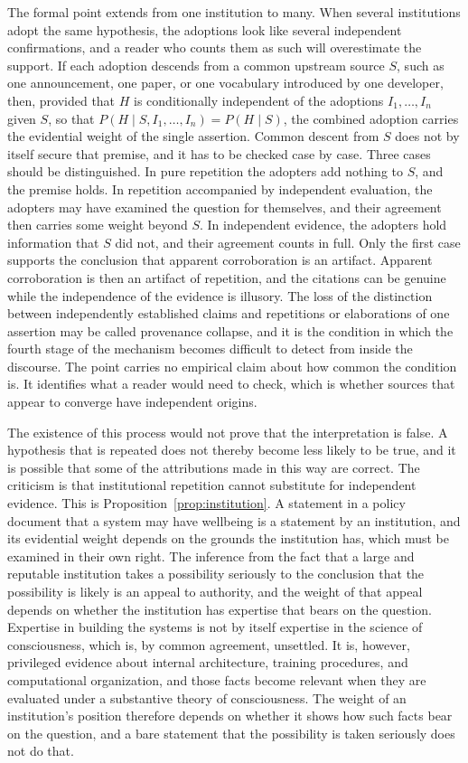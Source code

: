 \documentclass[12pt]{article}
\theoremstyle{definition}
\begin{document}
The formal point extends from one institution to many. When several institutions adopt the same hypothesis, the adoptions look like several independent confirmations, and a reader who counts them as such will overestimate the support. If each adoption descends from a common upstream source $S$, such as one announcement, one paper, or one vocabulary introduced by one developer, then, provided that $H$ is conditionally independent of the adoptions $I_1,\dots,I_n$ given $S$, so that $P(H\mid S, I_1,\dots,I_n)=P(H\mid S)$, the combined adoption carries the evidential weight of the single assertion. Common descent from $S$ does not by itself secure that premise, and it has to be checked case by case. Three cases should be distinguished. In pure repetition the adopters add nothing to $S$, and the premise holds. In repetition accompanied by independent evaluation, the adopters may have examined the question for themselves, and their agreement then carries some weight beyond $S$. In independent evidence, the adopters hold information that $S$ did not, and their agreement counts in full. Only the first case supports the conclusion that apparent corroboration is an artifact. Apparent corroboration is then an artifact of repetition, and the citations can be genuine while the independence of the evidence is illusory. The loss of the distinction between independently established claims and repetitions or elaborations of one assertion may be called provenance collapse, and it is the condition in which the fourth stage of the mechanism becomes difficult to detect from inside the discourse. The point carries no empirical claim about how common the condition is. It identifies what a reader would need to check, which is whether sources that appear to converge have independent origins.

The existence of this process would not prove that the interpretation is false. A hypothesis that is repeated does not thereby become less likely to be true, and it is possible that some of the attributions made in this way are correct. The criticism is that institutional repetition cannot substitute for independent evidence. This is Proposition~\ref{prop:institution}. A statement in a policy document that a system may have wellbeing is a statement by an institution, and its evidential weight depends on the grounds the institution has, which must be examined in their own right. The inference from the fact that a large and reputable institution takes a possibility seriously to the conclusion that the possibility is likely is an appeal to authority, and the weight of that appeal depends on whether the institution has expertise that bears on the question. Expertise in building the systems is not by itself expertise in the science of consciousness, which is, by common agreement, unsettled. It is, however, privileged evidence about internal architecture, training procedures, and computational organization, and those facts become relevant when they are evaluated under a substantive theory of consciousness. The weight of an institution's position therefore depends on whether it shows how such facts bear on the question, and a bare statement that the possibility is taken seriously does not do that.
\end{document}
